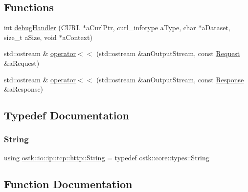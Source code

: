 \subsection*{Functions}
\begin{DoxyCompactItemize}
\item 
int \hyperlink{namespaceostk_1_1io_1_1ip_1_1tcp_1_1http_a45138e3931d393948e0b441b0cc73cb8}{debug\+Handler} (C\+U\+RL $\ast$a\+Curl\+Ptr, curl\+\_\+infotype a\+Type, char $\ast$a\+Dataset, size\+\_\+t a\+Size, void $\ast$a\+Context)
\item 
std\+::ostream \& \hyperlink{namespaceostk_1_1io_1_1ip_1_1tcp_1_1http_ad9796f0980e2843b959d6186f2baaba5}{operator$<$$<$} (std\+::ostream \&an\+Output\+Stream, const \hyperlink{classostk_1_1io_1_1ip_1_1tcp_1_1http_1_1_request}{Request} \&a\+Request)
\item 
std\+::ostream \& \hyperlink{namespaceostk_1_1io_1_1ip_1_1tcp_1_1http_a5e4d8aeae482fb84af49be6ed094edf7}{operator$<$$<$} (std\+::ostream \&an\+Output\+Stream, const \hyperlink{classostk_1_1io_1_1ip_1_1tcp_1_1http_1_1_response}{Response} \&a\+Response)
\end{DoxyCompactItemize}


\subsection{Typedef Documentation}
\mbox{\label{namespaceostk_1_1io_1_1ip_1_1tcp_1_1http_a88a1b82fb01d02df64ca01ef4058bbef}} 
\subsubsection{\texorpdfstring{String}{String}}
{\footnotesize\ttfamily using \hyperlink{namespaceostk_1_1io_1_1ip_1_1tcp_1_1http_a88a1b82fb01d02df64ca01ef4058bbef}{ostk\+::io\+::ip\+::tcp\+::http\+::\+String} = typedef ostk\+::core\+::types\+::\+String}



\subsection{Function Documentation}
\mbox{\label{namespaceostk_1_1io_1_1ip_1_1tcp_1_1http_a45138e3931d393948e0b441b0cc73cb8}} 
